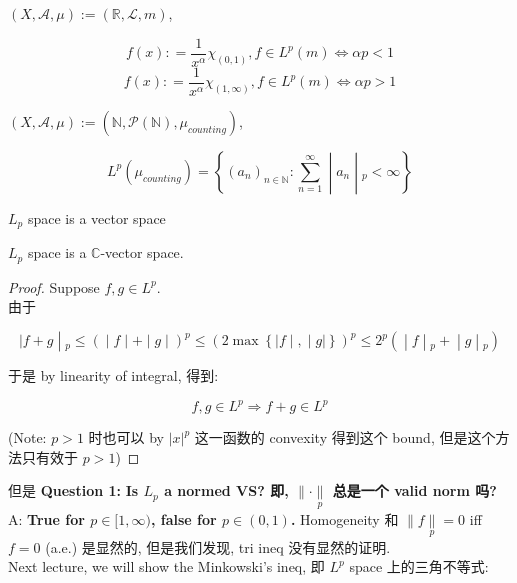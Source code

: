 \documentclass{qlnotes-export}
\begin{document}
\begin{example}\label{ex-09-l-p-space-and-inequalities-example-002}

\((X,\mathcal{A},\mu) := ({\mathbb{R}},\mathcal{L},m)\),

\[f(x): = \frac{1}{x^{\alpha}}\chi_{(0,1)}, f \in L^{p}(m)\Leftrightarrow\alpha p < 1\]\[f(x): = \frac{1}{x^{\alpha}}\chi_{(1,\infty)}, f \in L^{p}(m)\Leftrightarrow\alpha p > 1\]

\((X,\mathcal{A},\mu) := ({\mathbb{N}},\mathcal{P}({\mathbb{N}}),\mu_{counting})\),

\[L^{p}(\mu_{counting}) = \left\{ (a_{n})_{n \in {\mathbb{N}}}:\sum\limits_{n = 1}^{\infty} \middle| a_{n} \middle| {}_{p} < \infty \right\}\]

\end{example}

\begin{lemma}{\(L_{p}\) space is a vector space}\label{lem-09-l-p-space-and-inequalities-l-p-space-is-a-vector-space}

\(L_{p}\) space is a \(\mathbb{C}\)-vector space.

\end{lemma}

\begin{proof}

Suppose \(f,g \in L^{p}\).\\
由于

\[\left. |f + g \middle| {}_{p} \leq ( \middle| f \middle| + \middle| g \middle| )^{p} \leq (2\max\left\{ |f \middle| , \middle| g| \right\})^{p} \leq 2^{p}( \middle| f \middle| {}_{p} + \middle| g \middle| {}_{p}) \right.\]

于是 by linearity of integral, 得到:

\[f,g \in L^{p}\Longrightarrow f + g \in L^{p}\]

(Note: \(p > 1\) 时也可以 by \(|x|^{p}\) 这一函数的 convexity 得到这个 bound, 但是这个方法只有效于 \(p > 1\))

\end{proof}

但是 \textbf{Question 1:} \textbf{Is \(L_{p}\) a normed VS? 即, \(\parallel \cdot \underset{p}{\parallel}\) 总是一个 valid norm 吗?} A: \textbf{True for \(p \in \lbrack 1,\infty)\), false for \(p \in (0,1)\).} Homogeneity 和 \(\parallel f\underset{p}{\parallel} = 0\) iff \(f = 0\) (a.e.) 是显然的, 但是我们发现, tri ineq 没有显然的证明.\\
Next lecture, we will show the Minkowski's ineq, 即 \(L^{p}\) space 上的三角不等式:
\end{document}
